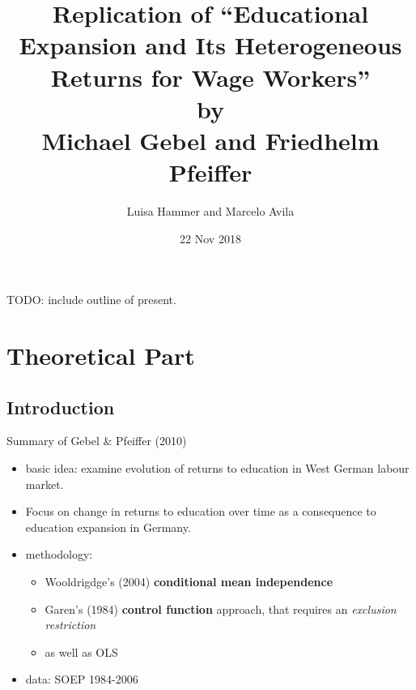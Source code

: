 \documentclass[10pt,ignorenonframetext,]{beamer}
\title{Replication of ``Educational Expansion and Its Heterogeneous Returns for
Wage Workers''\\
by\\
Michael Gebel and Friedhelm Pfeiffer}
\author{Luisa Hammer and Marcelo Avila}
\date{22 Nov 2018}
\providecommand{\tightlist}{%
  \setlength{\itemsep}{0pt}\setlength{\parskip}{0pt}}
\begin{document}
\frame{\titlepage}

\begin{frame}

TODO: include outline of present.

\end{frame}

\hypertarget{theoretical-part}{%
\section{Theoretical Part}\label{theoretical-part}}

\hypertarget{introduction}{%
\subsection{Introduction}\label{introduction}}

\begin{frame}{Summary of Gebel \& Pfeiffer (2010)}
\protect\hypertarget{summary-of-gebel-pfeiffer-2010}{}

\begin{itemize}
\tightlist
\item
  basic idea: examine evolution of returns to education in West German
  labour market.
\item
  Focus on change in returns to education over time as a consequence to
  education expansion in Germany.
\item
  methodology:

  \begin{itemize}
  \tightlist
  \item
    Wooldrigdge's (2004) \textbf{conditional mean independence}
  \item
    Garen's (1984) \textbf{control function} approach, that requires an
    \emph{exclusion restriction}
  \item
    as well as OLS
  \end{itemize}
\item
  data: SOEP 1984-2006
\end{itemize}

\end{frame}
\end{document}
